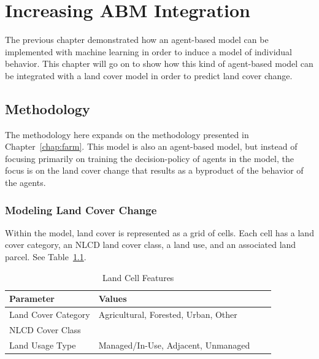 \chapter{Increasing ABM Integration}
\label{chap:land}


The previous chapter demonstrated how an agent-based model can be
implemented with machine learning in order to induce a model of
individual behavior.
This chapter will go on to show how this kind of agent-based model
can be integrated with a land cover model in order to predict
land cover change.

\section{Methodology}
\label{sec:land_methods}

The methodology here expands on the methodology presented in 
Chapter~\ref{chap:farm}.
This model is also an agent-based model, but instead of
focusing primarily on training the decision-policy of agents in the model,
the focus is on the land cover change that results as a byproduct of the
behavior of the agents.

\subsection{Modeling Land Cover Change}
\label{subsec:land_methods_cover}

Within the model, land cover is represented as a grid of cells.
Each cell has a land cover category, an NLCD land cover class,
a land use, and an associated land parcel. See Table~\ref{tab:land_cells}.

\begin{table}
\centering
\caption{Land Cell Features}
\label{tab:land_cells}
\begin{tabular}{llll}
\hline
\hline
    Parameter & Values \\
    \hline 
    Land Cover Category & Agricultural, Forested, Urban, Other \\
    NLCD Cover Class &  \\
    Land Usage Type & Managed/In-Use, Adjacent, Unmanaged \\
    \hline
\end{tabular}
\end{table}

